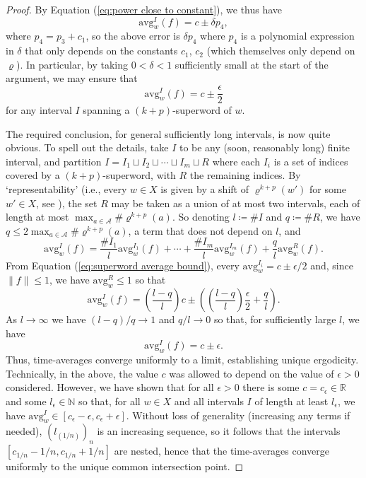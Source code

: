 \documentclass[11pt]{amsart}
\numberwithin{equation}{section}
\theoremstyle{plain}
\theoremstyle{definition}
\newcommand{\R}{{\mathbb R}}
\newcommand{\N}{{\mathbb N}}
\newcommand{\mc}{\mathcal}
\newcommand{\A}{\mc A}
\newcommand{\sub}{\varrho}
\newcommand{\avg}{\mathrm{avg}}
\begin{document}
\begin{proof}
By Equation (\ref{eq:power close to constant}), we thus have
\[
\avg_w^I(f) = c \pm \delta p_4 ,
\]
where \(p_4 = p_3 + c_1\), so the above error is \(\delta p_4\) where \(p_4\) is a polynomial expression in \(\delta\) that only depends on the constants \(c_1\), \(c_2\) (which themselves only depend on \(\sub\)). In particular, by taking \(0 < \delta < 1\) sufficiently small at the start of the argument, we may ensure that
\begin{equation} \label{eq:superword average bound}
\avg_w^I(f) = c \pm \frac{\epsilon}{2}
\end{equation}
for any interval \(I\) spanning a \((k+p)\)-superword of \(w\).

The required conclusion, for general sufficiently long intervals, is now quite obvious. To spell out the details, take \(I\) to be any (soon, reasonably long) finite interval, and partition \(I = I_1 \sqcup I_2 \sqcup \cdots \sqcup I_m \sqcup R\) where each \(I_i\) is a set of indices covered by a \((k+p)\)-superword, with \(R\) the remaining indices. By `representability' (i.e., every \(w \in X\) is given by a shift of \(\sub^{k+p}(w')\) for some \(w' \in X\), see \cite[Proposition 3.21]{MRW25}), the set \(R\) may be taken as a union of at most two intervals, each of length at most \(\max_{a \in \A} \# \sub^{k+p}(a)\). So denoting \(l \coloneqq \# I\) and \(q \coloneqq \# R\), we have \(q \leq 2 \max_{a \in \A} \# \sub^{k+p}(a)\), a term that does not depend on \(l\), and
\[
\avg_w^I(f) = \frac{\# I_1}{l}\avg_w^{I_1}(f) + \cdots + \frac{\# I_m}{l}\avg_w^{I_m}(f) + \frac{q}{l}\avg_w^R(f) .
\]
From Equation  (\ref{eq:superword average bound}), every \(\avg_w^{I_i} = c \pm \epsilon/2\) and, since \(\|f\| \leq 1\), we have \(\avg_w^R \leq 1\) so that
\[
\avg_w^I(f) = \left( \frac{l-q}{l} \right) c \pm \left(\left(\frac{l-q}{l}\right) \frac{\epsilon}{2} + \frac{q}{l}\right) .
\]
As \(l \to \infty\) we have \((l-q)/q \to 1\) and \(q/l \to 0\) so that, for sufficiently large \(l\), we have
\[
\avg_w^I(f) = c \pm \epsilon .
\]
Thus, time-averages converge uniformly to a limit, establishing unique ergodicity. Technically, in the above, the value \(c\) was allowed to depend on the value of \(\epsilon > 0\) considered. However, we have shown that for all \(\epsilon > 0\) there is some \(c = c_\epsilon \in \R\) and some \(l_\epsilon \in \N\) so that, for all \(w \in X\) and all intervals \(I\) of length at least \(l_\epsilon\), we have \(\avg_w^I \in [c_\epsilon - \epsilon , c_\epsilon + \epsilon]\). Without loss of generality (increasing any terms if needed), \((l_{(1/n)})_n\) is an increasing sequence, so it follows that the intervals \([c_{1/n} - 1/n , c_{1/n} + 1/n]\) are nested, hence that the time-averages converge uniformly to the unique common intersection point.
\end{proof}



\end{document}
